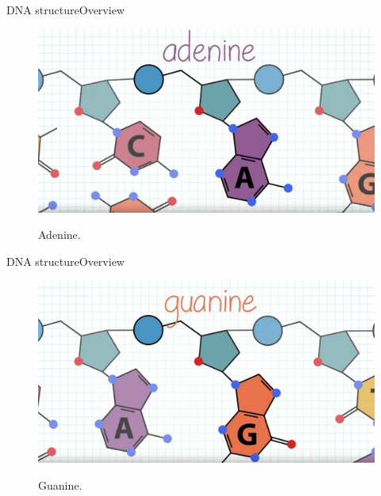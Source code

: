 \documentclass[10pt]{beamer}
\begin{document}
{%
\begin{frame}{DNA structure}{Overview}
	\begin{figure}[]
		\centering
		\includegraphics[width=\textwidth,height=0.7\textheight,keepaspectratio]{img/introduction/dna8.jpg}
		\label{img:mot2}
		\caption{Adenine.}
	\end{figure}
\end{frame}

\begin{frame}{DNA structure}{Overview}
	\begin{figure}[]
		\centering
		\includegraphics[width=\textwidth,height=0.7\textheight,keepaspectratio]{img/introduction/dna9.jpg}
		\label{img:mot2}
		\caption{Guanine.}
	\end{figure}
\end{frame}

}
\end{document}
